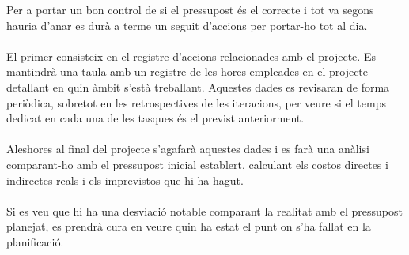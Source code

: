 Per a portar un bon control de si el pressupost és el correcte i tot va segons hauria d’anar es durà a terme un seguit d’accions per portar-ho tot al dia.
\\\\
El primer consisteix en el registre d’accions relacionades amb el projecte. Es mantindrà una taula amb un registre de les hores empleades en el projecte detallant en quin àmbit s’està treballant. Aquestes dades es revisaran de forma periòdica, sobretot en les retrospectives de les iteracions, per veure si el temps dedicat en cada una de les tasques és el previst anteriorment.
\\\\
Aleshores al final del projecte s’agafarà aquestes dades i es farà una anàlisi comparant-ho amb el pressupost inicial establert, calculant els costos directes i indirectes reals i els imprevistos que hi ha hagut.
\\\\
Si es veu que hi ha una desviació notable comparant la realitat amb el pressupost planejat, es prendrà cura en veure quin ha estat el punt on s’ha fallat en la planificació.